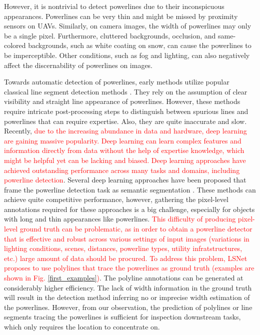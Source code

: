 \documentclass[journal]{IEEEtran}
\newcommand{\textK}[1]{\textcolor{red}{#1}}
\begin{document}
However, it is nontrivial to detect powerlines due to their inconspicuous appearances. Powerlines can be very thin and might be missed by proximity sensors on UAVs. Similarly, on camera images, the width of powerlines may only be a single pixel. Furthermore, cluttered backgrounds, occlusion, and same-colored backgrounds, such as white coating on snow, can cause the powerlines to be imperceptible. Other conditions, such as fog and lighting, can also negatively affect the discernability of powerlines on images. 

Towards automatic detection of powerlines, early methods utilize popular classical line segment detection methods \cite{related_work_kasturi_2002, related_work_guanjian_yan_2007, related_work_li_zhenrong_2010, related_work_candamo_2009, related_work_golightly_2005, related_work_zhengrong_li_2008, related_work_boris_alpatov_2016}. They rely on the assumption of clear visibility and straight line appearance of powerlines. However, these methods require intricate post-processing steps to distinguish between spurious lines and powerlines that can require expertise. Also, they are quite inaccurate and slow. Recently, \textK{due to the increasing abundance in data and hardware, deep learning are gaining massive popularity. Deep learning can learn complex features and information directly from data without the help of expertise knowledge, which might be helpful yet can be lacking and biased. Deep learning approaches have achieved outstanding performance across many tasks and domains, including powerline detection}. Several deep learning approaches have been proposed that frame the powerline detection task as semantic segmentation \cite{related_work_rainesh_mandaan_2017,related_work_heng_zhang_2019,related_work_yan_li_2019,related_work_rabab_abdelfattah_2022,related_work_rabeea_haffari_2021}. These methods can achieve quite competitive performance, however, gathering the pixel-level annotations required for these approaches is a big challenge, especially for objects with long and thin appearances like powerlines. \textK{This difficulty of producing pixel-level ground truth can be problematic, as in order to obtain a powerline detector that is effective and robust across various settings of input images (variations in lighting conditions, scenes, distances, powerline types, utility infratstructures, etc.) large amount of data should be procured.} \textK{To address this problem, LSNet \cite{Nguyen2020} proposes to use polylines that trace the powerlines as ground truth (examples are shown in Fig. \ref{first_examples})}. The polyline annotations can be generated at considerably higher efficiency. The lack of width information in the ground truth will result in the detection method inferring no or imprecise width estimation of the powerlines. However, from our observation, the prediction of polylines or line segments tracing the powerlines is sufficient for inspection downstream tasks, which only requires the location to concentrate on.
\end{document}

